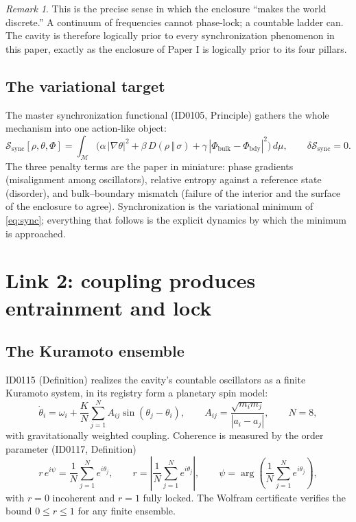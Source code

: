 \documentclass[11pt]{article}
\theoremstyle{remark}
\newtheorem{remark}[theorem]{Remark}
\begin{document}
\begin{remark}
This is the precise sense in which the enclosure ``makes the world discrete.'' A continuum of frequencies cannot phase-lock; a countable ladder can. The cavity is therefore logically prior to every synchronization phenomenon in this paper, exactly as the enclosure of Paper I is logically prior to its four pillars.
\end{remark}

\subsection{The variational target}

The master synchronization functional (ID0105, Principle) gathers the whole mechanism into one action-like object:
\begin{equation}
\mathcal{S}_{\mathrm{sync}}[\rho, \theta, \Phi] = \int_{\mathcal{M}} \Big( \alpha\, |\nabla\theta|^2 + \beta\, D(\rho \,\Vert\, \sigma) + \gamma\, |\Phi_{\mathrm{bulk}} - \Phi_{\mathrm{bdy}}|^2 \Big)\, d\mu, \qquad \delta \mathcal{S}_{\mathrm{sync}} = 0.
\label{eq:sync}
\end{equation}
The three penalty terms are the paper in miniature: phase gradients (misalignment among oscillators), relative entropy against a reference state (disorder), and bulk--boundary mismatch (failure of the interior and the surface of the enclosure to agree). Synchronization is the variational minimum of \eqref{eq:sync}; everything that follows is the explicit dynamics by which the minimum is approached.

\section{Link 2: coupling produces entrainment and lock}
\label{sec:kuramoto}

\subsection{The Kuramoto ensemble}

ID0115 (Definition) realizes the cavity's countable oscillators as a finite Kuramoto system, in its registry form a planetary spin model:
\begin{equation}
\dot{\theta}_i = \omega_i + \frac{K}{N}\sum_{j=1}^{N} A_{ij}\sin(\theta_j - \theta_i), \qquad
A_{ij} = \frac{\sqrt{m_i m_j}}{|a_i - a_j|}, \qquad N = 8,
\label{eq:kuramoto}
\end{equation}
with gravitationally weighted coupling. Coherence is measured by the order parameter (ID0117, Definition)
\begin{equation}
r\, e^{i\psi} = \frac{1}{N}\sum_{j=1}^{N} e^{i\theta_j}, \qquad
r = \left| \frac{1}{N}\sum_{j=1}^{N} e^{i\theta_j} \right|, \qquad
\psi = \arg\!\left( \frac{1}{N}\sum_{j=1}^{N} e^{i\theta_j} \right),
\label{eq:order}
\end{equation}
with $r = 0$ incoherent and $r = 1$ fully locked. The Wolfram certificate verifies the bound $0 \leq r \leq 1$ for any finite ensemble.
\end{document}

